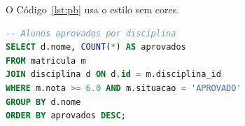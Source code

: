 \documentclass[12pt, a4paper, brazilian]{abntex2}
\begin{document}
O Código~\ref{lst:pb} usa o estilo sem cores.

\begin{lstlisting}[language=SQL, style=codigopb,
    caption={O mesmo código em preto e branco (estilo \texttt{codigopb})},
    label={lst:pb}]
-- Alunos aprovados por disciplina
SELECT d.nome, COUNT(*) AS aprovados
FROM matricula m
JOIN disciplina d ON d.id = m.disciplina_id
WHERE m.nota >= 6.0 AND m.situacao = 'APROVADO'
GROUP BY d.nome
ORDER BY aprovados DESC;
\end{lstlisting}
\end{document}
